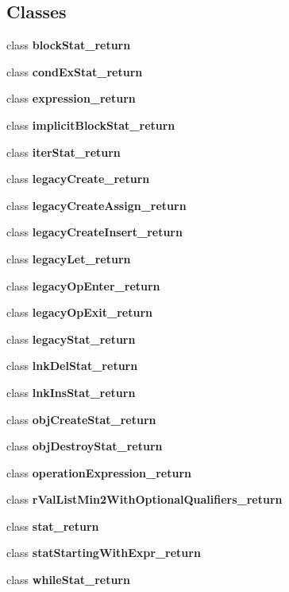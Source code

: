\subsection*{Classes}
\begin{DoxyCompactItemize}
\item 
class {\bfseries block\-Stat\-\_\-return}
\item 
class {\bfseries cond\-Ex\-Stat\-\_\-return}
\item 
class {\bfseries expression\-\_\-return}
\item 
class {\bfseries implicit\-Block\-Stat\-\_\-return}
\item 
class {\bfseries iter\-Stat\-\_\-return}
\item 
class {\bfseries legacy\-Create\-\_\-return}
\item 
class {\bfseries legacy\-Create\-Assign\-\_\-return}
\item 
class {\bfseries legacy\-Create\-Insert\-\_\-return}
\item 
class {\bfseries legacy\-Let\-\_\-return}
\item 
class {\bfseries legacy\-Op\-Enter\-\_\-return}
\item 
class {\bfseries legacy\-Op\-Exit\-\_\-return}
\item 
class {\bfseries legacy\-Stat\-\_\-return}
\item 
class {\bfseries lnk\-Del\-Stat\-\_\-return}
\item 
class {\bfseries lnk\-Ins\-Stat\-\_\-return}
\item 
class {\bfseries obj\-Create\-Stat\-\_\-return}
\item 
class {\bfseries obj\-Destroy\-Stat\-\_\-return}
\item 
class {\bfseries operation\-Expression\-\_\-return}
\item 
class {\bfseries r\-Val\-List\-Min2\-With\-Optional\-Qualifiers\-\_\-return}
\item 
class {\bfseries stat\-\_\-return}
\item 
class {\bfseries stat\-Starting\-With\-Expr\-\_\-return}
\item 
class {\bfseries while\-Stat\-\_\-return}
\end{DoxyCompactItemize}
